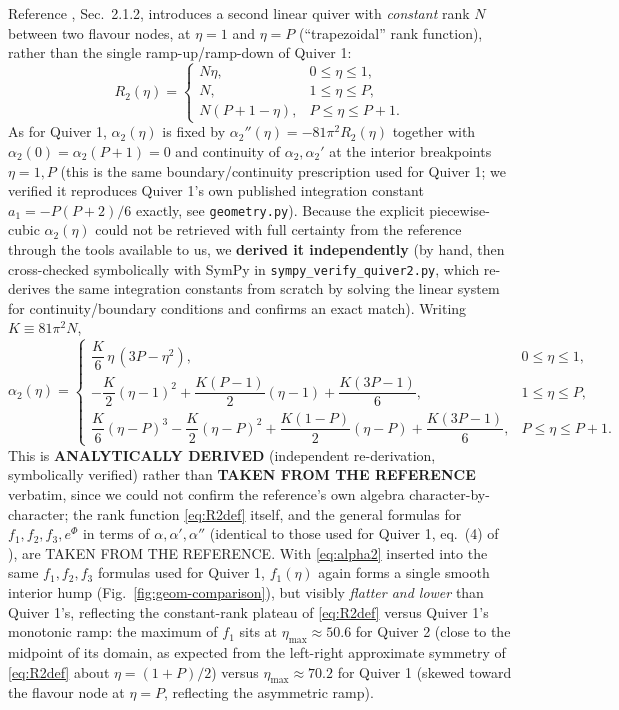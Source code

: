 \documentclass[11pt]{article}
\begin{document}
Reference \cite{Fatemiabhari:2026rob}, Sec.~2.1.2, introduces a second linear quiver with \emph{constant} rank $N$ between two flavour nodes, at $\eta=1$ and $\eta=P$ (``trapezoidal'' rank function), rather than the single ramp-up/ramp-down of Quiver 1:
\begin{equation}
R_2(\eta)=
\begin{cases}
N\eta, & 0\le\eta\le1,\\
N, & 1\le\eta\le P,\\
N(P+1-\eta), & P\le\eta\le P+1.
\end{cases}
\label{eq:R2def}
\end{equation}
As for Quiver 1, $\alpha_2(\eta)$ is fixed by $\alpha_2''(\eta)=-81\pi^2R_2(\eta)$ together with $\alpha_2(0)=\alpha_2(P+1)=0$ and continuity of $\alpha_2,\alpha_2'$ at the interior breakpoints $\eta=1,P$ (this is the same boundary/continuity prescription used for Quiver 1; we verified it reproduces Quiver 1's own published integration constant $a_1=-P(P+2)/6$ exactly, see \texttt{geometry.py}). Because the explicit piecewise-cubic $\alpha_2(\eta)$ could not be retrieved with full certainty from the reference through the tools available to us, we \textbf{derived it independently} (by hand, then cross-checked symbolically with SymPy in \texttt{sympy\_verify\_quiver2.py}, which re-derives the same integration constants from scratch by solving the linear system for continuity/boundary conditions and confirms an exact match). Writing $K\equiv81\pi^2N$,
\begin{equation}
\alpha_2(\eta)=
\begin{cases}
\dfrac{K}{6}\,\eta\,(3P-\eta^2), & 0\le\eta\le1,\\[2mm]
-\dfrac{K}{2}(\eta-1)^2+\dfrac{K(P-1)}{2}(\eta-1)+\dfrac{K(3P-1)}{6}, & 1\le\eta\le P,\\[2mm]
\dfrac{K}{6}(\eta-P)^3-\dfrac{K}{2}(\eta-P)^2+\dfrac{K(1-P)}{2}(\eta-P)+\dfrac{K(3P-1)}{6}, & P\le\eta\le P+1.
\end{cases}
\label{eq:alpha2}
\end{equation}
This is \textbf{ANALYTICALLY DERIVED} (independent re-derivation, symbolically verified) rather than \textbf{TAKEN FROM THE REFERENCE} verbatim, since we could not confirm the reference's own algebra character-by-character; the rank function \eqref{eq:R2def} itself, and the general formulas for $f_1,f_2,f_3,e^\Phi$ in terms of $\alpha,\alpha',\alpha''$ (identical to those used for Quiver 1, eq.~(4) of \cite{Fatemiabhari:2026rob}), are TAKEN FROM THE REFERENCE. With \eqref{eq:alpha2} inserted into the same $f_1,f_2,f_3$ formulas used for Quiver 1, $f_1(\eta)$ again forms a single smooth interior hump (Fig.~\ref{fig:geom-comparison}), but visibly \emph{flatter and lower} than Quiver 1's, reflecting the constant-rank plateau of \eqref{eq:R2def} versus Quiver 1's monotonic ramp: the maximum of $f_1$ sits at $\eta_{\max}\approx50.6$ for Quiver 2 (close to the midpoint of its domain, as expected from the left-right approximate symmetry of \eqref{eq:R2def} about $\eta=(1+P)/2$) versus $\eta_{\max}\approx70.2$ for Quiver 1 (skewed toward the flavour node at $\eta=P$, reflecting the asymmetric ramp).
\end{document}
